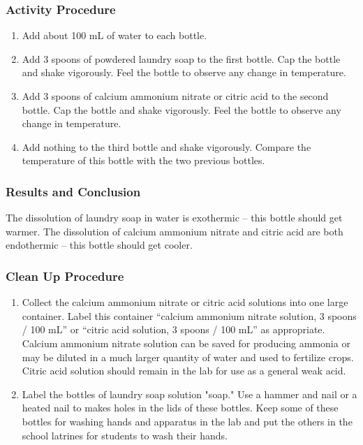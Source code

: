 \subsubsection*{Activity Procedure}
\begin{enumerate}
\item{Add about 100 mL of water to each bottle.}
\item{Add 3 spoons of powdered laundry soap to the first bottle. Cap the bottle and shake vigorously. Feel the bottle to observe any change in temperature.}
\item{Add 3 spoons of calcium ammonium nitrate or citric acid to the second bottle. Cap the bottle and shake vigorously. Feel the bottle to observe any change in temperature.}
\item{Add nothing to the third bottle and shake vigorously. Compare the temperature of this bottle with the two previous bottles.}
\end{enumerate}

\subsubsection*{Results and Conclusion}
The dissolution of laundry soap in water is exothermic -- this bottle should get warmer. The dissolution of calcium ammonium nitrate and citric acid are both endothermic -- this bottle should get cooler.

\subsubsection*{Clean Up Procedure}
\begin{enumerate}
\item{Collect the calcium ammonium nitrate or citric acid solutions into one large container. Label this container ``calcium ammonium nitrate solution, 3 spoons / 100 mL'' or ``citric acid solution, 3 spoons / 100 mL'' as appropriate. Calcium ammonium nitrate solution can be saved for producing ammonia or may be diluted in a much larger quantity of water and used to fertilize crops. Citric acid solution should remain in the lab for use as a general weak acid.}
\item{Label the bottles of laundry soap solution "soap." Use a hammer and nail or a heated nail to makes holes in the lids of these bottles. Keep some of these bottles for washing hands and apparatus in the lab and put the others in the school latrines for students to wash their hands.}
\end{enumerate}

